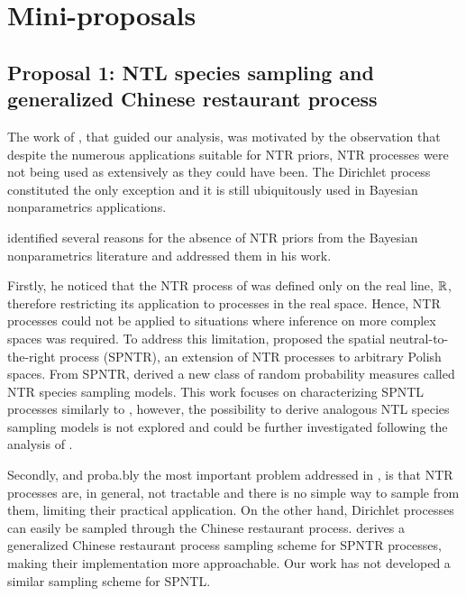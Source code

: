

\section{Mini-proposals}  \label{proposals}

\subsection{Proposal 1: NTL species sampling and generalized Chinese restaurant process} %

The work of \cite{james2006poisson}, that guided our analysis, was motivated by the observation that despite the numerous applications suitable for NTR priors, NTR processes were not being used as extensively as they could have been. The Dirichlet process constituted the only exception and it is still ubiquitously used in Bayesian nonparametrics applications. 

\cite{james2006poisson} identified several reasons for the absence of NTR priors from the Bayesian nonparametrics literature and addressed them in his work.

Firstly, he noticed that the NTR process of \cite{doksum1974tailfree} was defined only on the real line, $\mathbb{R}$, therefore restricting its application to processes in the real space. Hence, NTR processes could not be applied to situations where inference on more complex spaces was required. To address this limitation, \cite{james2006poisson} proposed the spatial neutral-to-the-right process (SPNTR), an extension of NTR processes to arbitrary Polish spaces. From SPNTR, \cite{james2006poisson} derived a new class of random probability measures called NTR species sampling models. This work focuses on characterizing SPNTL processes similarly to \cite{james2006poisson}, however, the possibility to derive analogous NTL species sampling models is not explored and could be further investigated following the analysis of \cite{james2006poisson}.

Secondly, and proba.bly the most important problem addressed in \cite{james2006poisson}, is that NTR processes are, in general, not tractable and there is no simple way to sample from them, limiting their practical application. On the other hand, Dirichlet processes can easily be sampled through the Chinese restaurant process. \cite{james2006poisson} derives a generalized Chinese restaurant process sampling scheme for SPNTR processes, making their implementation more approachable. Our work has not developed a similar sampling scheme for SPNTL.

